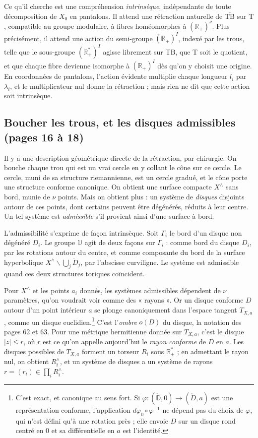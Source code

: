 \documentclass[11pt,a4paper]{article}
\begin{document}
Ce qu'il cherche est une compréhension \emph{intrinsèque}, indépendante de
toute décomposition de $X_0$ en pantalons. Il attend une rétraction
naturelle de $\overline{\mathrm{TB}}$ sur $\mathrm{T}$, compatible au groupe
modulaire, à fibres homéomorphes à $(\mathbb{R}_{+})^{\nu}$. Plus
précisément, il attend une action du semi-groupe $(\mathbb{R}_{+})^{I}$,
indexé par les trous, telle que le sous-groupe $(\mathbb{R}^{*}_{+})^{I}$
agisse librement sur $\mathrm{TB}$, que $\mathrm{T}$ soit le quotient, et
que chaque fibre devienne isomorphe à $(\mathbb{R}_{+})^{I}$ dès qu'on y
choisit une origine. En coordonnées de pantalons, l'action évidente
multiplie chaque longueur $l_i$ par $\lambda_i$, et le multiplicateur nul
donne la rétraction ; mais rien ne dit que cette action soit intrinsèque.

\subsection*{Boucher les trous, et les disques admissibles (pages 16 à 18)}

Il y a une description géométrique directe de la rétraction, par chirurgie.
On bouche chaque trou qui est un vrai cercle en y collant le cône sur ce
cercle. Le cercle, muni de sa structure riemannienne, est un cercle gradué,
et le cône porte une structure conforme canonique. On obtient une surface
compacte $X^{\wedge}$ sans bord, munie de $\nu$ points. Mais on obtient plus :
un système de \emph{disques} disjoints autour de ces points, dont certains
peuvent être dégénérés, réduits à leur centre. Un tel système est
\emph{admissible} s'il provient ainsi d'une surface à bord.

L'admissibilité s'exprime de façon intrinsèque. Soit $\Gamma_i$ le bord d'un
disque non dégénéré $D_i$. Le groupe $\mathbb{U}$ agit de deux façons sur
$\Gamma_i$ : comme bord du disque $D_i$, par les rotations autour du centre,
et comme composante du bord de la surface hyperbolique
$X^{\wedge} \smallsetminus \bigcup_j \mathring{D}_j$, par l'abscisse
curviligne. Le système est admissible quand ces deux structures toriques
coïncident.

Pour $X^{\wedge}$ et les points $a_i$ donnés, les systèmes admissibles
dépendent de $\nu$ paramètres, qu'on voudrait voir comme des « rayons ». Or un
disque conforme $D$ autour d'un point intérieur $a$ se plonge canoniquement
dans l'espace tangent $T_{X,a}$, comme un disque euclidien.\footnote{C'est
exact, et canonique au sens fort. Si $\varphi : (\mathring{\mathbb{D}}, 0)
\to (\mathring{D}, a)$ est une représentation conforme, l'application
$d\varphi_0 \circ \varphi^{-1}$ ne dépend pas du choix de $\varphi$, qui n'est
défini qu'à une rotation près ; elle envoie $D$ sur un disque rond centré en
$0$ et sa différentielle en $a$ est l'identité.} C'est l'\emph{ombre} $o(D)$
du disque, la notation des pages 62 et 63. Pour une métrique hermitienne
donnée sur $T_{X,a}$, c'est le disque $|z| \leqslant r$, où $r$ est ce qu'on
appelle aujourd'hui le \emph{rayon conforme} de $D$ en $a$. Les disques
possibles de $T_{X,a}$ forment un torseur $R_i$ sous $\mathbb{R}^{*}_{+}$ ;
en admettant le rayon nul, on obtient $R_i^{\wedge}$, et un système de disques
a un système de rayons $r = (r_i) \in \prod_i R_i^{\wedge}$.
\end{document}
